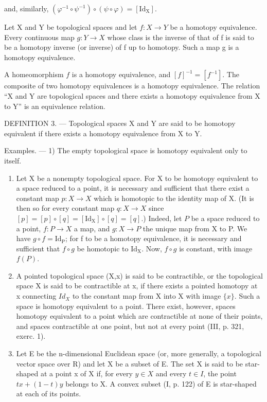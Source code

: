 and, similarly, \((\varphi^{-1} \circ \psi^{-1}) \circ (\psi \circ \varphi) = [\mathrm{Id}_{\mathrm{X}}]\).

Let X and Y be topological spaces and let \(f: X \to Y\) be a homotopy equivalence. Every continuous map \(g: Y \to X\) whose class is the inverse of that of f is said to be a homotopy inverse (or inverse) of f up to homotopy. Such a map g is a homotopy equivalence.

A homeomorphism \(f\) is a homotopy equivalence, and \([f]^{-1} = [f^{-1}]\). The composite of two homotopy equivalences is a homotopy equivalence. The relation “X and Y are topological spaces and there exists a homotopy equivalence from X to Y” is an equivalence relation.

DEFINITION 3. --- Topological spaces X and Y are said to be homotopy equivalent if there exists a homotopy equivalence from X to Y.

Examples. --- 1) The empty topological space is homotopy equivalent only to itself.

\begin{enumerate}
\def\labelenumi{\arabic{enumi})}
\setcounter{enumi}{1}
\item
  Let X be a nonempty topological space. For X to be homotopy equivalent to a space reduced to a point, it is necessary and sufficient that there exist a constant map \(p: X \rightarrow X\) which is homotopic to the identity map of X. (It is then so for every constant map \(q \colon X \to X\) since \([p] = [p] \circ [q] = [\mathrm{Id}_{\mathrm{X}}] \circ [q] = [q]\).) Indeed, let \(P\) be a space reduced to a point, \(f \colon P \to X\) a map, and \(g \colon X \to P\) the unique map from X to P. We have \(g \circ f = \mathrm{Id}_{\mathrm{P}}\); for f to be a homotopy equivalence, it is necessary and sufficient that \(f \circ g\) be homotopic to \(\mathrm{Id}_{\mathrm{X}}\). Now, \(f \circ g\) is constant, with image \(f(P)\).
\item
  A pointed topological space (X,x) is said to be contractible, or the topological space X is said to be contractible at x, if there exists a pointed homotopy at x connecting \(Id_{X}\) to the constant map from X into X with image \(\{x\}\). Such a space is homotopy equivalent to a point. There exist, however, spaces homotopy equivalent to a point which are contractible at none of their points, and spaces contractible at one point, but not at every point (III, p. 321, exerc. 1).
\item
  Let E be the n-dimensional Euclidean space (or, more generally, a topological vector space over R) and let X be a subset of E. The set X is said to be star-shaped at a point x of X if, for every \(y \in X\) and every \(t \in I\), the point \(tx + (1 - t)y\) belongs to X. A convex subset (I, p. 122) of E is star-shaped at each of its points.
\end{enumerate}

